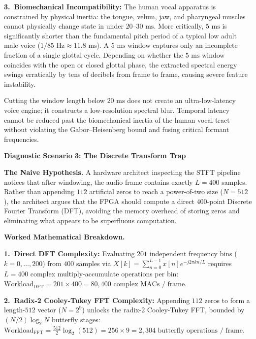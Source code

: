 \documentclass[11pt,a4paper]{article}
\newcommand{\diagsec}[1]{\vspace{1.6pt}\textbf{\large #1}\vspace{0.5pt}\par}
\begin{document}
\textbf{3.~Biomechanical Incompatibility:} The human vocal apparatus is constrained by physical inertia: the tongue, velum, jaw, and pharyngeal muscles cannot physically change state in under $20\text{--}30\text{ ms}$. More critically, $5\text{ ms}$ is significantly shorter than the fundamental pitch period of a typical low adult male voice ($1 / 85\text{ Hz} \approx 11.8\text{ ms}$). A $5\text{ ms}$ window captures only an incomplete fraction of a single glottal cycle. Depending on whether the $5\text{ ms}$ window coincides with the open or closed glottal phase, the extracted spectral energy swings erratically by tens of decibels from frame to frame, causing severe feature instability.

\begin{physicalinsight}
Cutting the window length below $20\text{ ms}$ does not create an ultra-low-latency voice engine; it constructs a low-resolution spectral blur. Temporal latency cannot be reduced past the biomechanical inertia of the human vocal tract without violating the Gabor--Heisenberg bound and fusing critical formant frequencies.
\end{physicalinsight}

\diagsec{Diagnostic Scenario 3: The Discrete Transform Trap}

\textbf{The Naive Hypothesis.} A hardware architect inspecting the STFT pipeline notices that after windowing, the audio frame contains exactly $L = 400$ samples. Rather than appending $112$ artificial zeros to reach a power-of-two size ($N = 512$), the architect argues that the FPGA should compute a direct 400-point Discrete Fourier Transform (DFT), avoiding the memory overhead of storing zeros and eliminating what appears to be superfluous computation.

\textbf{Worked Mathematical Breakdown.}

\textbf{1.~Direct DFT Complexity:} Evaluating $201$ independent frequency bins ($k = 0, \dots, 200$) from $400$ samples via $X[k] = \sum_{n=0}^{L-1} x[n] e^{-j 2\pi k n / L}$ requires $L = 400$ complex multiply-accumulate operations per bin:
$\text{Workload}_{\text{DFT}} = 201 \times 400 = 80{,}400\text{ complex MACs / frame}$.

\textbf{2.~Radix-2 Cooley-Tukey FFT Complexity:} Appending $112$ zeros to form a length-$512$ vector ($N = 2^9$) unlocks the radix-2 Cooley-Tukey FFT, bounded by $(N/2) \log_2 N$ butterfly stages:
$\text{Workload}_{\text{FFT}} = \frac{512}{2} \log_2(512) = 256 \times 9 = 2{,}304\text{ butterfly operations / frame}$.
\end{document}
